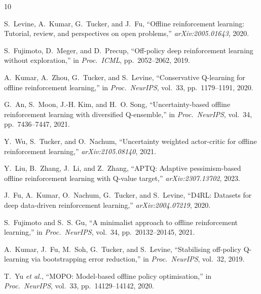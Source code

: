 \documentclass[conference]{IEEEtran}
\begin{document}
\begin{thebibliography}{10}

S.~Levine, A.~Kumar, G.~Tucker, and J.~Fu,
``Offline reinforcement learning: Tutorial, review, and perspectives on open
problems,'' \textit{arXiv:2005.01643}, 2020.

S.~Fujimoto, D.~Meger, and D.~Precup,
``Off-policy deep reinforcement learning without exploration,''
in \textit{Proc.\ ICML}, pp.~2052--2062, 2019.

A.~Kumar, A.~Zhou, G.~Tucker, and S.~Levine,
``Conservative Q-learning for offline reinforcement learning,''
in \textit{Proc.\ NeurIPS}, vol.~33, pp.~1179--1191, 2020.

G.~An, S.~Moon, J.-H. Kim, and H.~O. Song,
``Uncertainty-based offline reinforcement learning with diversified
Q-ensemble,''
in \textit{Proc.\ NeurIPS}, vol.~34, pp.~7436--7447, 2021.

Y.~Wu, S.~Tucker, and O.~Nachum,
``Uncertainty weighted actor-critic for offline reinforcement learning,''
\textit{arXiv:2105.08140}, 2021.

Y.~Liu, B.~Zhang, J.~Li, and Z.~Zhang,
``APTQ: Adaptive pessimism-based offline reinforcement learning with
Q-value target,''
\textit{arXiv:2307.13702}, 2023.

J.~Fu, A.~Kumar, O.~Nachum, G.~Tucker, and S.~Levine,
``D4RL: Datasets for deep data-driven reinforcement learning,''
\textit{arXiv:2004.07219}, 2020.

S.~Fujimoto and S.~S. Gu,
``A minimalist approach to offline reinforcement learning,''
in \textit{Proc.\ NeurIPS}, vol.~34, pp.~20132--20145, 2021.

A.~Kumar, J.~Fu, M.~Soh, G.~Tucker, and S.~Levine,
``Stabilising off-policy Q-learning via bootstrapping error reduction,''
in \textit{Proc.\ NeurIPS}, vol.~32, 2019.

T.~Yu \textit{et al.},
``MOPO: Model-based offline policy optimisation,''
in \textit{Proc.\ NeurIPS}, vol.~33, pp.~14129--14142, 2020.

\end{thebibliography}
\end{document}
